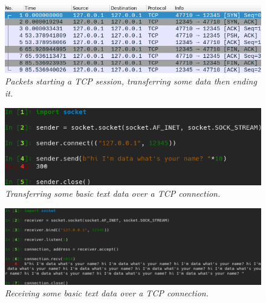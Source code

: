 \documentclass[titlepage]{article}
\begin{document}
\begin{figure}[H]
  \centering
  \includegraphics[width=\textwidth]{data_transfer.png}
  \caption{\textit{%
    Packets starting a TCP session, transferring some data then ending it.
}}\label{data_transfer}
\end{figure}

\begin{figure}[H]
  \centering
  \includegraphics[width=\textwidth]{sender.png}
  \caption{\textit{%
    Transferring some basic text data over a TCP connection.
}}\label{sender}
\end{figure}

\begin{figure}[H]
  \centering
  \includegraphics[width=\textwidth]{receiver.png}
  \caption{\textit{%
    Receiving some basic text data over a TCP connection.
}}\label{receiver}
\end{figure}
\end{document}
